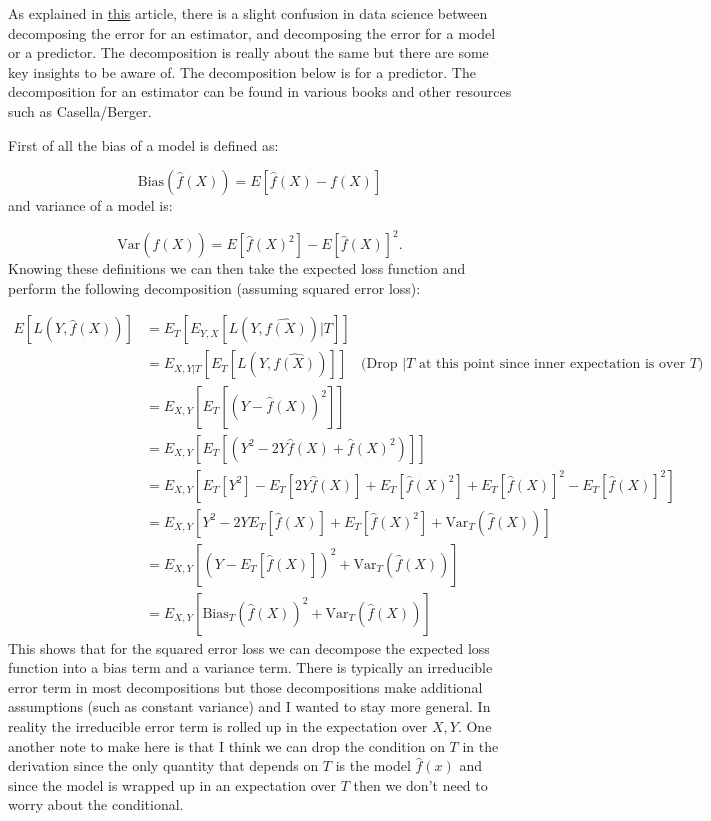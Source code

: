 As explained in \href{https://towardsdatascience.com/mse-and-bias-variance-decomposition-77449dd2ff55}{this} article, there is a slight confusion in data science between decomposing the error for an \gls{estimator}, and decomposing the error for a model or a predictor. The decomposition is really about the same but there are some key insights to be aware of. The decomposition below is for a predictor. The decomposition for an estimator can be found in various books and other resources such as Casella/Berger. 

First of all the bias of a model is defined as:

\begin{equation}
\text{Bias}\left(\hat{f}(X)\right) = E \left[\hat{f}(X) - f(X)\right]
\end{equation}
and variance of a model is:

\begin{equation}
\text{Var}\left(\hat{f}(X)\right) = E \left[\hat{f}(X)^2\right] - E \left[\hat{f}(X)\right]^2. 
\end{equation}
Knowing these definitions we can then take the expected loss function and perform the following decomposition (assuming squared error loss):

\begin{equation}
\begin{split}
E[L(Y, \hat{f}(X))] & = E_{T}[E_{Y,X}[L(Y, \hat{f(X)})|T]] \\
&= E_{X,Y|T}[E_{T}[L(Y, \hat{f(X)})]]  \quad \text{(Drop $|T$ at this point since inner expectation is over $T$)}\\
&= E_{X,Y}[E_{T}[(Y - \hat{f}(X))^2]] \\
&= E_{X,Y}[E_{T}[(Y^2 - 2Y\hat{f}(X) + \hat{f}(X)^2)]] \\
&= E_{X,Y}[E_{T}[Y^2] - E_{T}[2Y\hat{f}(X)] + E_{T}[\hat{f}(X)^2] + E_{T}[\hat{f}(X)]^2 - E_{T}[\hat{f}(X)]^2]\\
&= E_{X,Y}[Y^2 -  2YE_{T}[\hat{f}(X)] + E_{T}[\hat{f}(X)^2] + \text{Var}_{T}(\hat{f}(X))]\\
&=E_{X,Y}[(Y - E_{T}[\hat{f}(X)])^2 + \text{Var}_{T}(\hat{f}(X))] \\
&= E_{X,Y}[\text{Bias}_{T}(\hat{f}(X))^2 + \text{Var}_{T}(\hat{f}(X))] 
\end{split}
\end{equation}
This shows that for the squared error loss we can decompose the expected loss function into a bias term and a variance term. There is typically an irreducible error term in most decompositions but those decompositions make additional assumptions (such as constant variance) and I wanted to stay more general. In reality the irreducible error term is rolled up in the expectation over $X,Y$. One another note to make here is that I think we can drop the condition on $T$ in the derivation since the only quantity that depends on $T$ is the model $\hat{f}(x)$ and since the model is wrapped up in an expectation over $T$ then we don't need to worry about the conditional.

